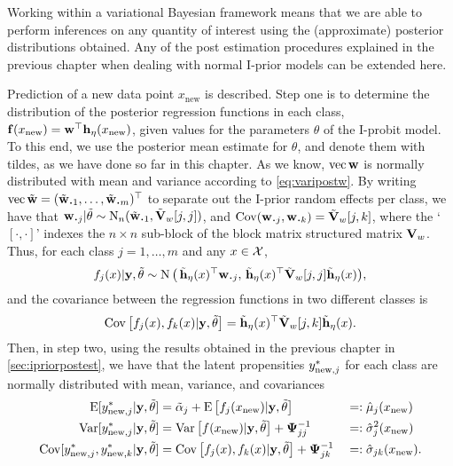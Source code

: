 Working within a variational Bayesian framework means that we are able to perform inferences on any quantity of interest using the (approximate) posterior distributions obtained.
Any of the post estimation procedures explained in the previous chapter when dealing with normal I-prior models can be extended here.

Prediction of a new data point $x_{\text{new}}$ is described.
Step one is to determine the distribution of the posterior regression functions in each class, ${\mathbf f}(x_{\text{new}}) = {\mathbf w}^\top{\mathbf h}_\eta(x_{\text{new}})$, given values for the parameters $\theta$ of the I-probit model.
To this end, we use the posterior mean estimate for $\theta$, and denote them with tildes, as we have done so far in this chapter.
As we know, $\operatorname{vec}{\mathbf w}$ is normally distributed with mean and variance according to \cref{eq:varipostw}.
By writing $\vecc \tilde\bw = (\tilde \bw_{\bigcdot 1}, \dots, \tilde \bw_{\bigcdot m})^\top$ to separate out the I-prior random effects per class, we have that $\bw_{\bigcdot j}|\tilde\theta \sim \N_n(\tilde \bw_{\bigcdot 1}, \tilde\bV_w[j,j])$, and $\Cov(\bw_{\bigcdot j},\bw_{\bigcdot k}) = \tilde\bV_w[j,k]$, where the `$[\cdot,\cdot]$' indexes the $n\times n$ sub-block of the block matrix structured matrix ${\mathbf V}_w$.
Thus, for each class $j=1,\dots,m$ and any $x \in {\mathcal X}$,
\[
  f_j(x)|\by,\tilde\theta \sim \N\big(\,
  \tilde\bh_\eta(x)^\top\bw_{\bigcdot j}, \,
  \tilde\bh_\eta(x)^\top\tilde\bV_w[j,j]\tilde\bh_\eta(x)
  \big),
\]
and the covariance between the regression functions in two different classes is
\[
  \operatorname{Cov}\big[f_j(x),f_k(x)|{\mathbf y},\tilde\theta \big] = 
  \tilde{{\mathbf h}}_\eta(x)^\top \tilde{{\mathbf V}}_w[j,k] \tilde{{\mathbf h}}_\eta(x).
\]
Then, in step two, using the results obtained in the previous chapter in \cref{sec:ipriorpostest}, we have that the latent propensities $y_{{\text{new}},j}^*$ for each class are normally distributed with mean, variance, and covariances
\begin{alignat*}{3}
  \operatorname{E}[y_{{\text{new}},j}^*|{\mathbf y},\tilde\theta]  
  &= \tilde\alpha_j + \operatorname{E} \big[ f_j(x_{\text{new}}) |{\mathbf y},\tilde\theta \big] 
  &&=: \hat\mu_j(x_\text{new}) \\
  \operatorname{Var}[y_{{\text{new}},j}^*|{\mathbf y},\tilde\theta] 
  &= \operatorname{Var}\big[f(x_{\text{new}})|{\mathbf y},\tilde\theta \big] + {\bm\Psi}^{-1}_{jj}
  &&=: \hat\sigma_j^2(x_\text{new}) \\
  \operatorname{Cov}[y_{{\text{new}},j}^*,y_{{\text{new}},k}^*|{\mathbf y},\tilde\theta] 
  &= \operatorname{Cov}\big[f_j(x),f_k(x)|{\mathbf y},\tilde\theta \big] + {\bm\Psi}^{-1}_{jk}
  &&=: \hat\sigma_{jk}(x_\text{new}).
\end{alignat*}

